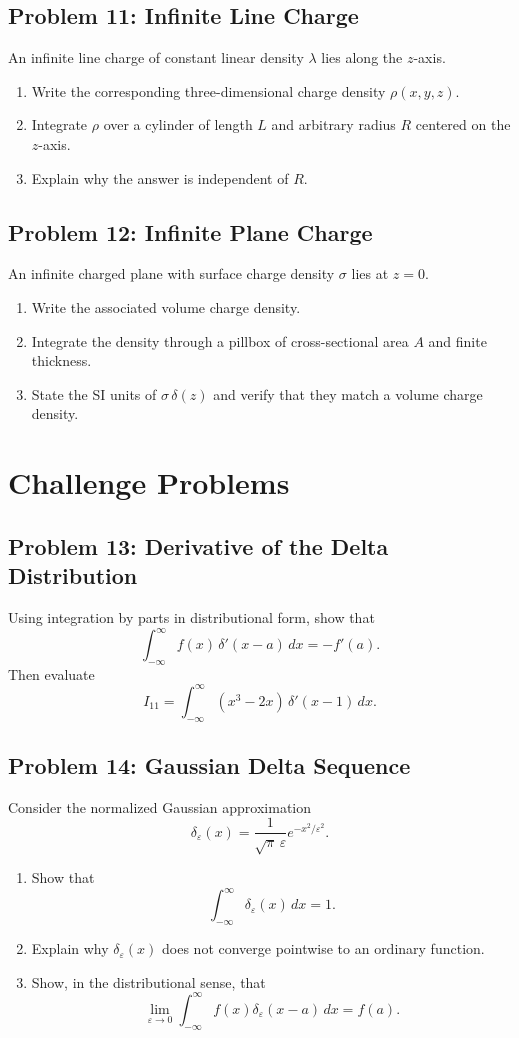 \documentclass[hidelinks]{article}
\begin{document}
\subsection{Problem 11: Infinite Line Charge}
An infinite line charge of constant linear density $\lambda$ lies along the $z$-axis.
\begin{enumerate}[label=\alph*)]
\item Write the corresponding three-dimensional charge density $\rho(x,y,z)$.
\item Integrate $\rho$ over a cylinder of length $L$ and arbitrary radius $R$ centered on the $z$-axis.
\item Explain why the answer is independent of $R$.
\end{enumerate}

\subsection{Problem 12: Infinite Plane Charge}
An infinite charged plane with surface charge density $\sigma$ lies at $z=0$.
\begin{enumerate}[label=\alph*)]
\item Write the associated volume charge density.
\item Integrate the density through a pillbox of cross-sectional area $A$ and finite thickness.
\item State the SI units of $\sigma\,\delta(z)$ and verify that they match a volume charge density.
\end{enumerate}

\section{Challenge Problems}

\subsection{Problem 13: Derivative of the Delta Distribution}
Using integration by parts in distributional form, show that
\[
\int_{-\infty}^{\infty} f(x)\,\delta'(x-a)\,dx=-f'(a).
\]
Then evaluate
\[
I_{11}=\int_{-\infty}^{\infty} (x^3-2x)\,\delta'(x-1)\,dx.
\]

\subsection{Problem 14: Gaussian Delta Sequence}
Consider the normalized Gaussian approximation
\[
\delta_\varepsilon(x)=\frac{1}{\sqrt{\pi}\,\varepsilon}e^{-x^2/\varepsilon^2}.
\]
\begin{enumerate}[label=\alph*)]
\item Show that
\[
\int_{-\infty}^{\infty}\delta_\varepsilon(x)\,dx=1.
\]
\item Explain why $\delta_\varepsilon(x)$ does not converge pointwise to an ordinary function.
\item Show, in the distributional sense, that
\[
\lim_{\varepsilon\to 0}\int_{-\infty}^{\infty} f(x)\delta_\varepsilon(x-a)\,dx=f(a).
\]
\end{enumerate}
\end{document}
